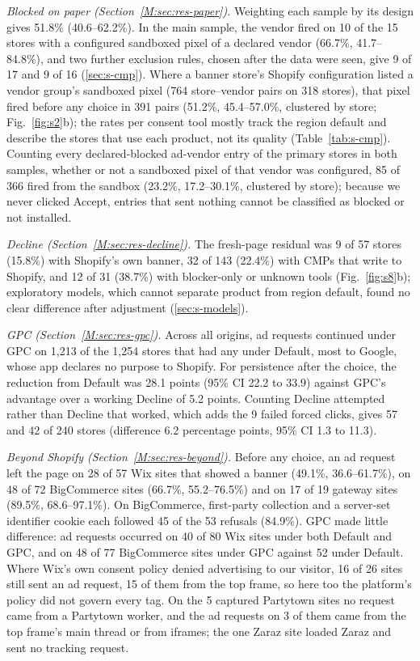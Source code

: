 \documentclass[preprint,11pt,authoryear,a4paper]{elsarticle}
\begin{document}
\emph{Blocked on paper (Section~\ref*{M:sec:res-paper}).} Weighting each sample by its design gives 51.8\% (40.6--62.2\%). In the main sample, the vendor fired on 10 of the 15 stores with a configured sandboxed pixel of a declared vendor (66.7\%, 41.7--84.8\%), and two further exclusion rules, chosen after the data were seen, give 9 of 17 and 9 of 16 (\ref{sec:s-cmp}). Where a banner store's Shopify configuration listed a vendor group's sandboxed pixel (764 store--vendor pairs on 318 stores), that pixel fired before any choice in 391 pairs (51.2\%, 45.4--57.0\%, clustered by store; Fig.~\ref{fig:s2}b); the rates per consent tool mostly track the region default and describe the stores that use each product, not its quality (Table~\ref{tab:s-cmp}). Counting every declared-blocked ad-vendor entry of the primary stores in both samples, whether or not a sandboxed pixel of that vendor was configured, 85 of 366 fired from the sandbox (23.2\%, 17.2--30.1\%, clustered by store); because we never clicked Accept, entries that sent nothing cannot be classified as blocked or not installed.

\emph{Decline (Section~\ref*{M:sec:res-decline}).} The fresh-page residual was 9 of 57 stores (15.8\%) with Shopify's own banner, 32 of 143 (22.4\%) with CMPs that write to Shopify, and 12 of 31 (38.7\%) with blocker-only or unknown tools (Fig.~\ref{fig:s8}b); exploratory models, which cannot separate product from region default, found no clear difference after adjustment (\ref{sec:s-models}).

\emph{GPC (Section~\ref*{M:sec:res-gpc}).} Across all origins, ad requests continued under GPC on 1,213 of the 1,254 stores that had any under Default, most to Google, whose app declares no purpose to Shopify. For persistence after the choice, the reduction from Default was 28.1 points (95\% CI 22.2 to 33.9) against GPC's advantage over a working Decline of 5.2 points. Counting Decline attempted rather than Decline that worked, which adds the 9 failed forced clicks, gives 57 and 42 of 240 stores (difference 6.2 percentage points, 95\% CI 1.3 to 11.3).

\emph{Beyond Shopify (Section~\ref*{M:sec:res-beyond}).} Before any choice, an ad request left the page on 28 of 57 Wix sites that showed a banner (49.1\%, 36.6--61.7\%), on 48 of 72 BigCommerce sites (66.7\%, 55.2--76.5\%) and on 17 of 19 gateway sites (89.5\%, 68.6--97.1\%). On BigCommerce, first-party collection and a server-set identifier cookie each followed 45 of the 53 refusals (84.9\%). GPC made little difference: ad requests occurred on 40 of 80 Wix sites under both Default and GPC, and on 48 of 77 BigCommerce sites under GPC against 52 under Default. Where Wix's own consent policy denied advertising to our visitor, 16 of 26 sites still sent an ad request, 15 of them from the top frame, so here too the platform's policy did not govern every tag. On the 5 captured Partytown sites no request came from a Partytown worker, and the ad requests on 3 of them came from the top frame's main thread or from iframes; the one Zaraz site loaded Zaraz and sent no tracking request.
\end{document}

